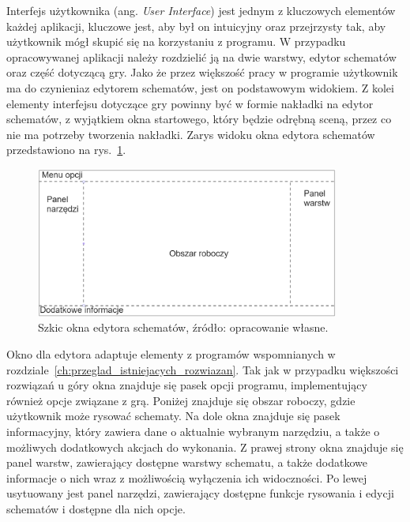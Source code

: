 Interfejs użytkownika (ang. \textit{User Interface}) jest jednym z kluczowych elementów każdej aplikacji,
kluczowe jest, aby był on intuicyjny oraz przejrzysty tak,
aby użytkownik mógł skupić się na korzystaniu z programu.
W przypadku opracowywanej aplikacji należy rozdzielić ją na dwie warstwy,
edytor schematów oraz część dotyczącą gry.
Jako że przez większość pracy w programie użytkownik ma do czynienia\linebreak z edytorem schematów,
jest on podstawowym widokiem.
Z kolei elementy interfejsu dotyczące gry powinny być w formie nakładki na edytor schematów,
z wyjątkiem okna startowego, który będzie odrębną sceną, przez co nie ma potrzeby tworzenia nakładki.
Zarys widoku okna edytora schematów przedstawiono na rys.~\ref{fig:editor}.

\begin{figure}[h]
    \centering
    \includegraphics[width=0.89\textwidth]{chapters/chapter3/rys/ui_projekt}
    \caption[Szkic okna edytora schematów]{Szkic okna edytora schematów, źródło: opracowanie własne.}
    \label{fig:editor}
\end{figure}

\indent Okno dla edytora adaptuje elementy
z programów wspomnianych w rozdziale~\ref{ch:przeglad_istniejacych_rozwiazan}.
Tak jak w przypadku większości rozwiązań u góry okna znajduje się pasek opcji programu,
implementujący również opcje związane z grą.
Poniżej znajduje się obszar roboczy, gdzie użytkownik może rysować schematy.
Na dole okna znajduje się pasek informacyjny, który zawiera dane o aktualnie wybranym narzędziu,
a także o możliwych dodatkowych akcjach do wykonania.
Z prawej strony okna znajduje się panel warstw, zawierający dostępne warstwy schematu,
a także dodatkowe informacje o nich wraz z możliwością wyłączenia ich widoczności.
Po lewej usytuowany jest panel narzędzi, zawierający dostępne funkcje rysowania i edycji schematów
i dostępne dla nich opcje.
